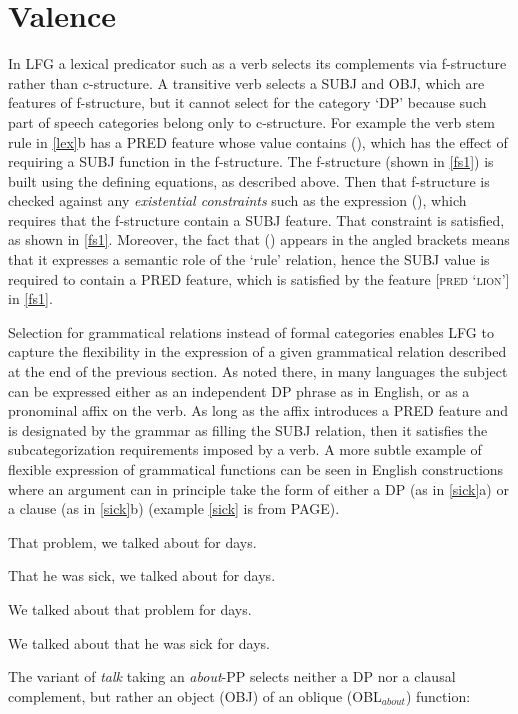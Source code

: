 \section{Valence} 
\label{valence-sec}
In LFG a lexical predicator such as a verb selects its complements via f-structure rather than c-structure.  A transitive verb selects a SUBJ and OBJ, which are features of f-structure, but it cannot select for the category `DP' because such part of speech categories belong only to c-structure.  For example the verb stem rule in \ref{lex}b has a PRED feature whose value contains (\up {}), which has the effect of requiring a SUBJ function in the f-structure.    The f-structure (shown in \ref{fs1}) is built using the defining equations, as described above.  Then that f-structure is checked against any \textit{existential constraints} such as  the expression (\up {}), which requires that the f-structure contain a SUBJ feature.  That constraint is satisfied, as shown in \ref{fs1}.  Moreover, the fact that (\up {}) appears in the angled brackets means that it expresses a semantic role of the `rule' relation, hence the SUBJ value is required to contain a PRED feature, which is satisfied by the feature [\textsc{pred} `\textsc{lion}'] in  \ref{fs1}.  

Selection for grammatical relations instead of formal categories enables LFG to capture the  flexibility in the expression of a given grammatical relation described at the end of the previous section.  As noted there, in many languages the subject can be expressed either as an independent DP phrase as in English, or as a pronominal affix on the verb.  As long as the affix introduces a PRED feature and is designated by the grammar as filling the SUBJ relation, then it satisfies the subcategorization requirements imposed by a verb.  A more subtle example of flexible expression of grammatical functions  can be seen in English constructions where an argument can in principle take the form of either a DP (as in \ref{sick}a) or a clause (as in \ref{sick}b) (example \ref{sick} is from \cite{BATW2015a} PAGE).  

\eal 
 \label{sick}
\ex That problem, we talked about for days.

\ex  That he was sick, we talked about for days.

\ex We talked about that problem for days.

\ex *We talked about that he was sick for days.

\zl
The variant of \textit{talk} taking an \textit{about}-PP selects neither a DP nor a clausal complement, but rather an object (OBJ) of an oblique (OBL$_{about}$) function:  

